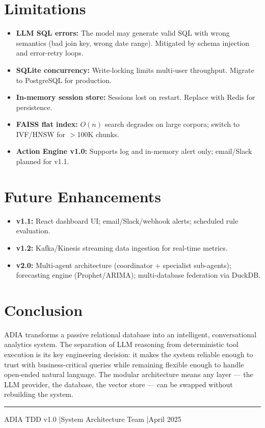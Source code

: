 \documentclass[11pt,a4paper]{article}
\begin{document}
\section{Limitations}

\begin{itemize}
  \item \textbf{LLM SQL errors:} The model may generate valid SQL with wrong semantics (bad join key, wrong date range). Mitigated by schema injection and error-retry loops.
  \item \textbf{SQLite concurrency:} Write-locking limits multi-user throughput. Migrate to PostgreSQL for production.
  \item \textbf{In-memory session store:} Sessions lost on restart. Replace with Redis for persistence.
  \item \textbf{FAISS flat index:} $O(n)$ search degrades on large corpora; switch to IVF/HNSW for $>$100K chunks.
  \item \textbf{Action Engine v1.0:} Supports log and in-memory alert only; email/Slack planned for v1.1.
\end{itemize}

\section{Future Enhancements}

\begin{itemize}
  \item \textbf{v1.1:} React dashboard UI; email/Slack/webhook alerts; scheduled rule evaluation.
  \item \textbf{v1.2:} Kafka/Kinesis streaming data ingestion for real-time metrics.
  \item \textbf{v2.0:} Multi-agent architecture (coordinator + specialist sub-agents); forecasting engine (Prophet/ARIMA); multi-database federation via DuckDB.
\end{itemize}

\section{Conclusion}

ADIA transforms a passive relational database into an intelligent, conversational analytics system. The separation of LLM reasoning from deterministic tool execution is its key engineering decision: it makes the system reliable enough to trust with business-critical queries while remaining flexible enough to handle open-ended natural language. The modular architecture means any layer --- the LLM provider, the database, the vector store --- can be swapped without rebuilding the system.

\vspace{0.8cm}
\noindent\color{primary}\rule{\linewidth}{0.5pt}\color{gray}
\begin{center}
  \small ADIA TDD v1.0 \quad|\quad System Architecture Team \quad|\quad April 2025
\end{center}
\end{document}
